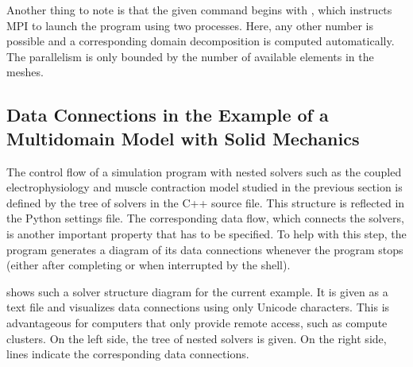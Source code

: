 Another thing to note is that the given command begins with , which instructs MPI to launch the program using two processes. Here, any other number is possible and a corresponding domain decomposition is computed automatically. The parallelism is only bounded by the number of available elements in the meshes.

\subsection{Data Connections in the Example of a Multidomain Model with Solid Mechanics}\label{sec:exemplary_usage_2b}

The control flow of a simulation program with nested solvers such as the coupled electrophysiology and muscle contraction model studied in the previous section is defined by the tree of solvers in the C++ source file. This structure is reflected in the Python settings file.
The corresponding data flow, which connects the solvers, is another important property that has to be specified.
To help with this step, the program generates a diagram of its data connections whenever the program stops (either after completing or when interrupted by the shell).

 shows such a solver structure diagram for the current example. It is given as a text file and visualizes data connections using only Unicode characters. This is advantageous for computers that only provide remote access, such as compute clusters. 
On the left side, the tree of nested solvers is given. On the right side, lines indicate the corresponding data connections.

